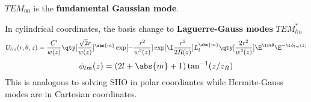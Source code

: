 $TEM_{00}$ is the \textbf{fundamental Gaussian mode}.

In cylindrical coordinates, the basis change to \textbf{Laguerre-Gauss modes} $TEM_{lm}^*$
\begin{equation}
U_{lm}(r, \theta, z) = \frac{C'}{w(z)} \qty[\frac{\sqrt{2}r}{w(z)}]^{\abs{m}} \exp[-\frac{r^2}{w^2(z)}] \exp[\I \frac{r^2}{2R(z)}] L_l^{\abs{m}} \qty[\frac{2r^2}{w^2(z)}] \E^{\I m\theta} \E^{-\I \phi_{lm}(z)}
\end{equation}
\begin{equation}
\phi_{lm}(z) = (2l + \abs{m} + 1) \tan^{-1} (z/z_R)
\end{equation}
This is analogous to solving SHO in polar coordiantes while Hermite-Gauss modes are in Cartesian coordinates. 

